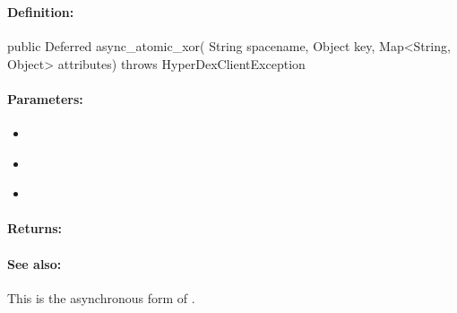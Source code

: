 \pagebreak
\subsubsection{}
\label{api:java:async_atomic_xor}


\paragraph{Definition:}
\begin{javacode}
public Deferred async_atomic_xor(
        String spacename,
        Object key,
        Map<String, Object> attributes) throws HyperDexClientException
\end{javacode}

\paragraph{Parameters:}
\begin{itemize}[noitemsep]
\item {}\\

\item {}\\

\item {}\\

\end{itemize}

\paragraph{Returns:}


\paragraph{See also:}  This is the asynchronous form of .

\pagebreak
\subsubsection{}
\label{api:java:cond_atomic_xor}


